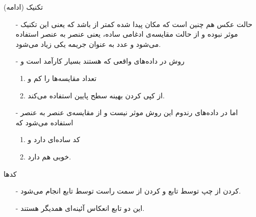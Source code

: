 \begin{frame}{تکنیک  (ادامه)}
\begin{itemize}\itemr
\item[-]
حالت عکس هم چنین است که مکان پیدا شده کمتر از 
باشد که یعنی این تکنیک موثر نبوده و از حالت مقایسه‌ی ادغامی ساده، یعنی عنصر به عنصر استفاده می‌شود و عدد
به عنوان جریمه یکی زیاد می‌شود.

\item[-]
روش  در داده‌های واقعی که  هستند بسیار کارآمد است و
\begin{enumerate}\itemr
\item
تعداد مقایسه‌ها را کم و
\item
از کپی کردن بهینه سطح پایین استفاده می‌کند.
\end{enumerate}

\item[-]
اما در داده‌های رندوم این روش موثر نیست و از مقایسه‌ی عنصر به عنصر استفاده می‌شود که 
\begin{enumerate}\itemr
\item
کد ساده‌ای دارد و
\item
{}
 خوبی هم دارد.
\end{enumerate}
\end{itemize}
\end{frame}

\begin{frame}{کدها}
\begin{itemize}\itemr
\item[-]
کردن از چپ توسط تابع
و 
کردن از سمت راست توسط تابع
انجام می‌شود.

\item[-]
این دو تابع انعکاس آئینه‌ای همدیگر هستند.
\end{itemize}
\end{frame}